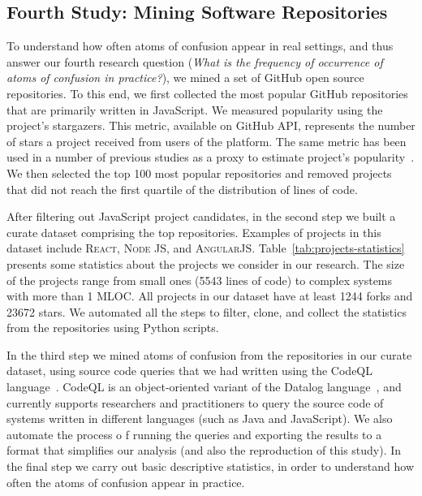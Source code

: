 

\subsection{Fourth Study: Mining Software Repositories}

To understand how often atoms of confusion appear in real settings, and thus answer our fourth research question (\emph{What is the frequency of occurrence of atoms of confusion in practice?}), we mined a set of GitHub open source repositories. To this end, we first collected the most popular GitHub repositories that are primarily written in JavaScript. We measured popularity using the project's stargazers. This metric, available on  GitHub API, represents the number of stars a project received from users of the platform. The same metric has been used in a number of previous studies as a proxy to estimate project's popularity~\cite{gyimesi2019bugsjs,canedo:esem2020}. We then selected the top 100 most popular repositories and removed projects that did not reach the first quartile of the distribution of lines of code.

After filtering out JavaScript project candidates, in the second step we built a curate dataset comprising the top \minedprojects repositories. Examples of projects in this dataset include \textsc{React}, \textsc{Node JS}, and \textsc{AngularJS}. Table~\ref{tab:projects-statistics} presents some statistics about the projects we consider in our research. The size of the projects range from small ones (5543 lines of code) to complex systems with more than 1 MLOC. All projects in our dataset have at least \num{1244} forks and \num{23672} stars. We automated all the steps to filter, clone, and collect the statistics from the repositories using Python scripts.

In the third step we mined atoms of confusion from the repositories in our curate dataset, using source code queries that we had written using the CodeQL language~\cite{moor:gttse2007}. CodeQL is an object-oriented variant of the Datalog language~\cite{rodriguez2020efficient}, and currently supports researchers and practitioners to query the source code of systems written in different languages (such as Java and JavaScript). We also automate the process o
f running the queries and exporting the results to a format that simplifies our
analysis (and also the reproduction of this study). In the final step we carry
out basic descriptive statistics, in order to understand how often the
atoms of confusion appear in practice. 

